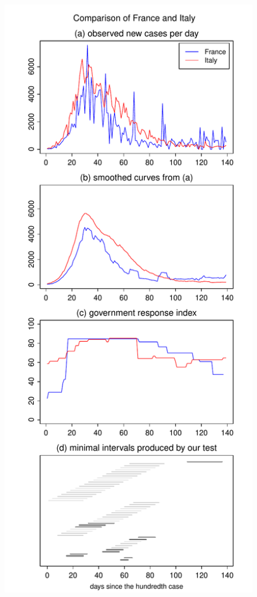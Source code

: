 \documentclass[a4paper,12pt]{article}
\numberwithin{equation}{section}
\begin{document}
\begin{figure}[h!]
\begin{minipage}[t]{0.49\textwidth}
\includegraphics[width=\textwidth]{plots/FRA_vs_ITA}

\end{minipage}
\end{figure}
\end{document}
